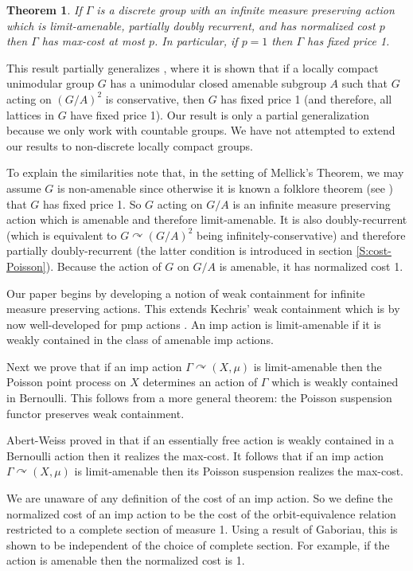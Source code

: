 \documentclass[12pt]{article}
\theoremstyle{plain}
\newtheorem{thm}{Theorem}[section]
\theoremstyle{definition}
\theoremstyle{remark}
\newcommand{\G}{\Gamma}
\def\cc{{\curvearrowright}}
\begin{document}
\begin{thm}\label{T:main-intro}
    If $\G$ is a discrete group with an infinite measure preserving action which is limit-amenable, partially doubly recurrent, and has normalized cost $p$ then $\G$ has max-cost at most $p$. In particular, if $p=1$ then $\G$ has fixed price 1.
\end{thm}

This result partially generalizes \cite{mellick2023gaboriauscriterionfixedprice}, where it is shown that if a locally compact unimodular group $G$ has a unimodular closed amenable subgroup $A$ such that $G$ acting on $(G/A)^2$ is conservative, then $G$ has fixed price 1 (and therefore, all lattices in $G$ have fixed price 1). Our result is only a partial generalization because we only work with countable groups. We have not attempted to extend our results to non-discrete locally compact groups.

To explain the similarities note that, in the setting of Mellick's Theorem, we may assume $G$ is non-amenable since otherwise it is known a folklore theorem (see \cite[Proposition 4.3]{MR3335405})  that $G$ has fixed price 1. So $G$ acting on $G/A$ is an infinite measure preserving action which is amenable and therefore limit-amenable. It is also doubly-recurrent (which is equivalent to $G \cc (G/A)^2$ being infinitely-conservative) and therefore partially doubly-recurrent (the latter condition is introduced in section \ref{S:cost-Poisson}). Because the action of $G$ on $G/A$ is amenable, it has normalized cost 1. 

Our paper begins by developing a notion of weak containment for infinite measure preserving actions. This extends Kechris' weak containment which is by now well-developed for pmp actions \cite{MR4138908}. An imp action is limit-amenable if it is weakly contained in the class of amenable imp actions. 


Next we prove that if an imp action $\G \cc (X,\mu)$ is limit-amenable then the Poisson point process on $X$ determines an action of $\G$ which is weakly contained in Bernoulli. This follows from a more general theorem: the Poisson suspension functor preserves weak containment. 

Abert-Weiss proved in \cite{abert-weiss-2013} that if an essentially free action is weakly contained in a Bernoulli action then it realizes the max-cost. It follows that if an imp action $\G \cc (X,\mu)$ is limit-amenable then its Poisson suspension realizes the max-cost.

We are unaware of any definition of the cost of an imp action. So we define the normalized cost of an imp action to be the cost of the orbit-equivalence relation restricted to a complete section of measure 1. Using a result of Gaboriau, this is shown to be independent of the choice of complete section. For example, if the action is amenable then the normalized cost is 1.
\end{document}
